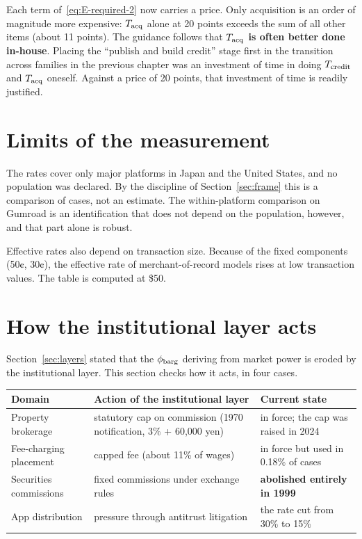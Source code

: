 Each term of~\eqref{eq:E-required-2} now carries a price. Only acquisition is an order of
magnitude more expensive: $T_{\rm acq}$ alone at 20 points exceeds the sum of all other items
(about 11 points). The guidance follows that
\textbf{$T_{\rm acq}$ is often better done in-house}. Placing the ``publish and build credit''
stage first in the transition across families in the previous chapter was an investment of
time in doing $T_{\rm credit}$ and $T_{\rm acq}$ oneself. Against a price of 20 points, that
investment of time is readily justified.

\section{Limits of the measurement}

The rates cover only major platforms in Japan and the United States, and no population was
declared. By the discipline of Section~\ref{sec:frame} this is a comparison of cases, not an
estimate. The within-platform comparison on Gumroad is an identification that does not depend
on the population, however, and that part alone is robust.

Effective rates also depend on transaction size. Because of the fixed components (50¢, 30¢),
the effective rate of merchant-of-record models rises at low transaction values. The table is
computed at \$50.

\section{How the institutional layer acts}
\label{sec:institution-mode}

Section~\ref{sec:layers} stated that the $\phi_{\rm barg}$ deriving from market power is
eroded by the institutional layer. This section checks how it acts, in four cases.

\begin{center}
\begin{tabularx}{\textwidth}{@{}lXl@{}}
\toprule
Domain & Action of the institutional layer & Current state \\
\midrule
Property brokerage & statutory cap on commission (1970 notification, 3\% + 60{,}000 yen) & in force; the cap was raised in 2024 \\
Fee-charging placement & capped fee (about 11\% of wages) & in force but used in 0.18\% of cases \\
Securities commissions & fixed commissions under exchange rules & \textbf{abolished entirely in 1999} \\
App distribution & pressure through antitrust litigation & the rate cut from 30\% to 15\% \\
\bottomrule
\end{tabularx}
\label{tab:fee-institution-modes}
\end{center}

